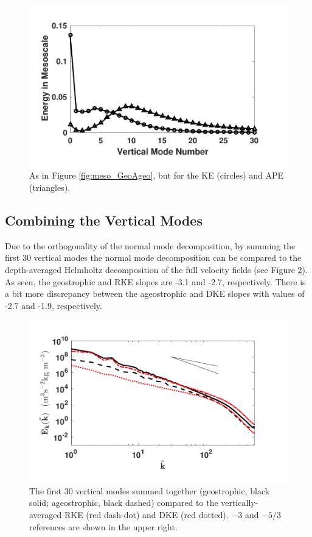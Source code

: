 \begin{figure}[H]
\vspace{0cm}
\includegraphics[scale=1]{Chapter4/img/meso_KEPE}
\vspace{0cm}
\caption{As in Figure \ref{fig:meso_GeoAgeo}, but for the KE (circles) and APE (triangles).}
\label{fig:meso_KEPE}
\end{figure}

\subsection{Combining the Vertical Modes}
Due to the orthogonality of the normal mode decomposition, by summing the first 30 vertical modes the normal mode decomposition can be compared to the depth-averaged Helmholtz decomposition of the full velocity fields (see Figure \ref{fig:totalGeoAgeo}).  As seen, the geostrophic and RKE slopes are -3.1 and -2.7, respectively. There is a bit more discrepancy between the ageostrophic and DKE slopes with values of -2.7 and -1.9, respectively. 

\begin{figure}[H]
\includegraphics[scale=1]{Chapter4/img/totalGeoAgeo}
\vspace{-0.5in}
\caption{The first 30 vertical modes summed together (geostrophic, black solid; ageostrophic, black dashed) compared to the vertically-averaged RKE (red dash-dot) and DKE (red dotted). $-3$ and $-5/3$ references are shown in the upper right.}
\label{fig:totalGeoAgeo}
\end{figure}

